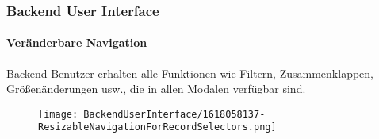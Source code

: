 %

\begin{frame}[fragile]
	\frametitle{Backend User Interface}
	\framesubtitle{Veränderbare Navigation}

	Backend-Benutzer erhalten alle Funktionen wie Filtern, Zusammenklappen, Größenänderungen
	usw., die in allen Modalen verfügbar sind.

	\begin{figure}
		\texttt{[image: BackendUserInterface/1618058137-ResizableNavigationForRecordSelectors.png]}
	\end{figure}

\end{frame}

